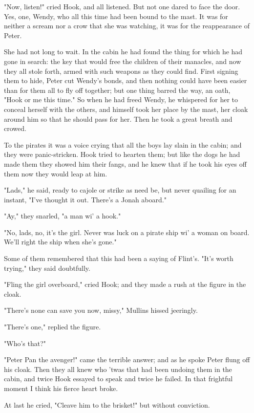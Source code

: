 "Now, listen!" cried Hook, and all listened. But not one dared to face the
door. Yes, one, Wendy, who all this time had been bound to the mast. It
was for neither a scream nor a crow that she was watching, it was for the
reappearance of Peter.


She had not long to wait. In the cabin he had found the thing for which he
had gone in search: the key that would free the children of their
manacles, and now they all stole forth, armed with such weapons as they
could find. First signing them to hide, Peter cut Wendy's bonds, and then
nothing could have been easier than for them all to fly off together; but
one thing barred the way, an oath, "Hook or me this time." So when he had
freed Wendy, he whispered for her to conceal herself with the others, and
himself took her place by the mast, her cloak around him so that he should
pass for her. Then he took a great breath and crowed.


To the pirates it was a voice crying that all the boys lay slain in the
cabin; and they were panic-stricken. Hook tried to hearten them; but like
the dogs he had made them they showed him their fangs, and he knew that if
he took his eyes off them now they would leap at him.


"Lads," he said, ready to cajole or strike as need be, but never quailing
for an instant, "I've thought it out. There's a Jonah aboard."


"Ay," they snarled, "a man wi' a hook."


"No, lads, no, it's the girl. Never was luck on a pirate ship wi' a woman
on board. We'll right the ship when she's gone."


Some of them remembered that this had been a saying of Flint's. "It's
worth trying," they said doubtfully.


"Fling the girl overboard," cried Hook; and they made a rush at the figure
in the cloak.


"There's none can save you now, missy," Mullins hissed jeeringly.


"There's one," replied the figure.


"Who's that?"


"Peter Pan the avenger!" came the terrible answer; and as he spoke Peter
flung off his cloak. Then they all knew who 'twas that had been undoing
them in the cabin, and twice Hook essayed to speak and twice he failed. In
that frightful moment I think his fierce heart broke.


At last he cried, "Cleave him to the brisket!" but without conviction.


